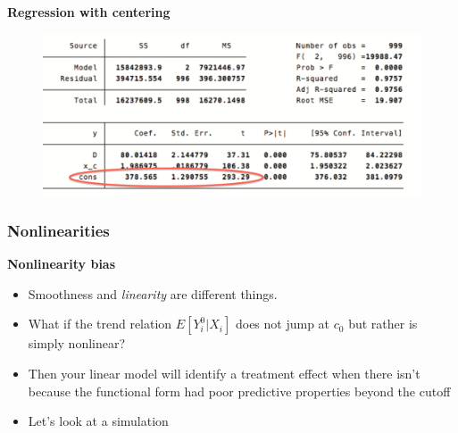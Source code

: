 \documentclass[notes=show]{beamer}
\begin{document}
\begin{frame}[plain]
\begin{center}
\textbf{Regression with centering}
\end{center}

 

\end{frame}

\begin{frame}[plain]

	\begin{figure}
	\includegraphics[scale=0.15]{./lecture_includes/centering2.png}
	\end{figure}

\end{frame}



\subsubsection{Nonlinearities}

\begin{frame}[plain]
	\begin{center}
	\textbf{Nonlinearity bias}
	\end{center}
	
	\begin{itemize}
	\item Smoothness and \emph{linearity} are different things.  
	\item What if the trend relation $E[Y_i^0 | X_i]$ does not jump at $c_0$ but rather is simply nonlinear?  
	\item Then your linear model will identify a treatment effect when there isn't because the functional form had poor predictive properties beyond the cutoff
	\item Let's look at a simulation
	\end{itemize}

\end{frame}
\end{document}
